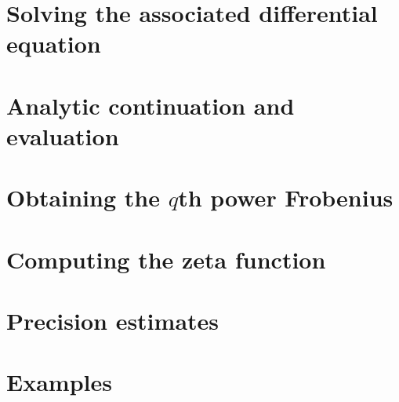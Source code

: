 


\chapter{Solving the associated differential equation}


\chapter{Analytic continuation and evaluation}


\chapter{Obtaining the $q$th power Frobenius}


\chapter{Computing the zeta function}


\chapter{Precision estimates}




\chapter{Examples}

